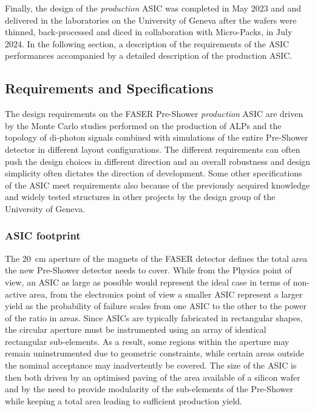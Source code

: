 	Finally, the design of the \textit{production} ASIC was completed in May 2023 and and delivered in the laboratories on the University of Geneva after the wafers were thinned, back-processed and diced in collaboration with Micro-Packs, in July 2024. In the following section, a description of the requirements of the ASIC performances accompanied by a detailed description of the production ASIC. 
	
		\subsection{Requirements and Specifications}
		The design requirements on the FASER Pre-Shower \textit{production} ASIC are driven by the Monte Carlo studies performed on the production of ALPs and the topology of di-photon signals combined with simulations of the entire Pre-Shower detector in different layout configurations. The different requirements can often push the design choices in different direction and an overall robustness and design simplicity often dictates the direction of development. Some other specifications of the ASIC meet requirements also because of the previously acquired knowledge and widely tested structures in other projects by the design group of the University of Geneva. 
		
		\subsubsection{ASIC footprint}
		The \SI{20}{\centi\meter} aperture of the magnets of the FASER detector defines the total area the new Pre-Shower detector needs to cover. While from the Physics point of view, an ASIC as large as possible would represent the ideal case in terms of non-active area, from the electronics point of view a smaller ASIC represent a larger yield as the probability of failure scales from one ASIC to the other to the power of the ratio in areas. Since ASICs are typically fabricated in rectangular shapes, the circular aperture must be instrumented using an array of identical rectangular sub-elements. As a result, some regions within the aperture may remain uninstrumented due to geometric constraints, while certain areas outside the nominal acceptance may inadvertently be covered. The size of the ASIC is then both driven by an optimised paving of the area available of a silicon wafer and by the need to provide modularity of the sub-elements of the Pre-Shower while keeping a total area leading to sufficient production yield. 
		
